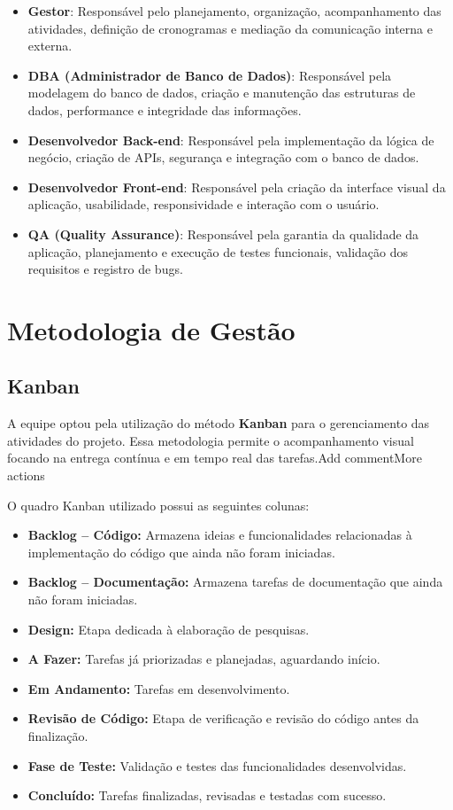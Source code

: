 \documentclass[
	12pt,				%
	openany,			%
	twoside,			%
	a4paper,			%
	english,			%
	brazil				%
	]{abntex2}
\begin{document}
\begin{itemize}
    \item \textbf{Gestor}: Responsável pelo planejamento, organização, acompanhamento das atividades, definição de cronogramas e mediação da comunicação interna e externa.
    \item \textbf{DBA (Administrador de Banco de Dados)}: Responsável pela modelagem do banco de dados, criação e manutenção das estruturas de dados, performance e integridade das informações.
    \item \textbf{Desenvolvedor Back-end}: Responsável pela implementação da lógica de negócio, criação de APIs, segurança e integração com o banco de dados.
    \item \textbf{Desenvolvedor Front-end}: Responsável pela criação da interface visual da aplicação, usabilidade, responsividade e interação com o usuário.
    \item \textbf{QA (Quality Assurance)}: Responsável pela garantia da qualidade da aplicação, planejamento e execução de testes funcionais, validação dos requisitos e registro de bugs.
\end{itemize}

\section{Metodologia de Gestão}

\subsection{Kanban}

A equipe optou pela utilização do método \textbf{Kanban} para o gerenciamento das atividades do projeto. Essa metodologia permite o acompanhamento visual focando na entrega contínua e em tempo real das tarefas.Add commentMore actions

O quadro Kanban utilizado possui as seguintes colunas:

\begin{itemize}
    \item \textbf{Backlog – Código:} Armazena ideias e funcionalidades relacionadas à implementação do código que ainda não foram iniciadas.
    \item \textbf{Backlog – Documentação:} Armazena tarefas de documentação que ainda não foram iniciadas.
    \item \textbf{Design:} Etapa dedicada à elaboração de pesquisas.
    \item \textbf{A Fazer:} Tarefas já priorizadas e planejadas, aguardando início.
    \item \textbf{Em Andamento:} Tarefas em desenvolvimento.
    \item \textbf{Revisão de Código:} Etapa de verificação e revisão do código antes da finalização.
    \item \textbf{Fase de Teste:} Validação e testes das funcionalidades desenvolvidas.
    \item \textbf{Concluído:} Tarefas finalizadas, revisadas e testadas com sucesso.
\end{itemize}
\end{document}
